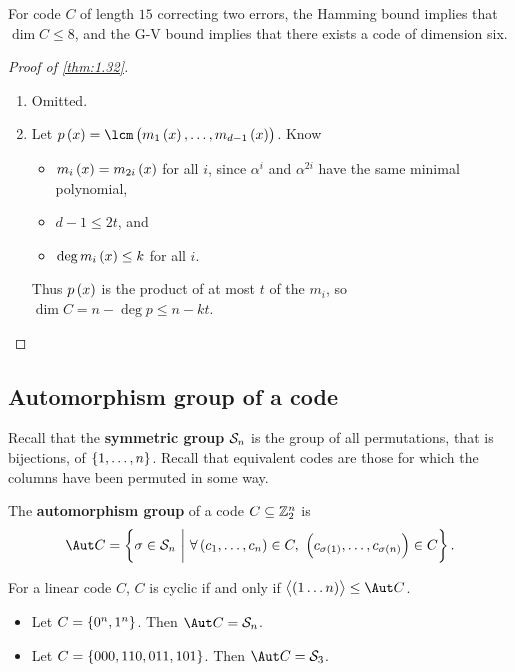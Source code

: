 \begin{note*}
For code $ C $ of length $ 15 $ correcting two errors, the Hamming bound implies that $ \dim C \le 8 $, and the G-V bound implies that there exists a code of dimension six.
\end{note*}

\begin{proof}[Proof of \ref{thm:1.32}]
\hfill
\begin{enumerate}
\item Omitted.
\item Let $ p\br{x} = \lcm\br{m_1\br{x}, \dots, m_{d - 1}\br{x}} $. Know
\begin{itemize}
\item $ m_i\br{x} = m_{2i}\br{x} $ for all $ i $, since $ \alpha^i $ and $ \alpha^{2i} $ have the same minimal polynomial,
\item $ d - 1 \le 2t $, and
\item $ \deg m_i\br{x} \le k $ for all $ i $.
\end{itemize}
Thus $ p\br{x} $ is the product of at most $ t $ of the $ m_i $, so $ \dim C = n - \deg p \le n - kt $.
\end{enumerate}
\end{proof}

\subsection{Automorphism group of a code}

Recall that the \textbf{symmetric group} $ \mathcal{S}_n $ is the group of all permutations, that is bijections, of $ \cbr{1, \dots, n} $. Recall that equivalent codes are those for which the columns have been permuted in some way.

\begin{definition*}
The \textbf{automorphism group} of a code $ C \subseteq \mathbb{Z}_2^n $ is
$$ \Aut C = \cbr{\sigma \in \SSS_n \st \forall \br{c_1, \dots, c_n} \in C, \ \br{c_{\sigma\br{1}}, \dots, c_{\sigma\br{n}}} \in C}. $$
\end{definition*}

\begin{remark*}
For a linear code $ C $, $ C $ is cyclic if and only if $ \abr{\br{1 \dots n}} \le \Aut C $.
\end{remark*}

\begin{example*}
\hfill
\begin{itemize}
\item Let $ C = \cbr{0^n, 1^n} $. Then $ \Aut C = \SSS_n $.
\item Let $ C = \cbr{000, 110, 011, 101} $. Then $ \Aut C = \SSS_3 $.
\end{itemize}
\end{example*}

